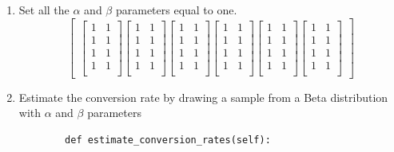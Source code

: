 \begin{enumerate}
    \item Set all the $\alpha$ and $\beta$ parameters equal to one. \[\begin{bmatrix}
    \begin{bmatrix}
        1 & 1\\
        1 & 1\\
        1 & 1\\
        1 & 1\\
    \end{bmatrix}
    \begin{bmatrix}
        1 & 1\\
        1 & 1\\
        1 & 1\\
        1 & 1\\
    \end{bmatrix}
    \begin{bmatrix}
        1 & 1\\
        1 & 1\\
        1 & 1\\
        1 & 1\\
    \end{bmatrix}
    \begin{bmatrix}
        1 & 1\\
        1 & 1\\
        1 & 1\\
        1 & 1\\
    \end{bmatrix}
    \begin{bmatrix}
        1 & 1\\
        1 & 1\\
        1 & 1\\
        1 & 1\\
    \end{bmatrix}
    \begin{bmatrix}
        1 & 1\\
        1 & 1\\
        1 & 1\\
        1 & 1\\
    \end{bmatrix}
    \end{bmatrix} \]
    \item Estimate the conversion rate by drawing a sample from a Beta distribution with $\alpha$ and $\beta$ parameters \begin{verbatim}
        def estimate_conversion_rates(self):

\end{verbatim}
\end{enumerate}

